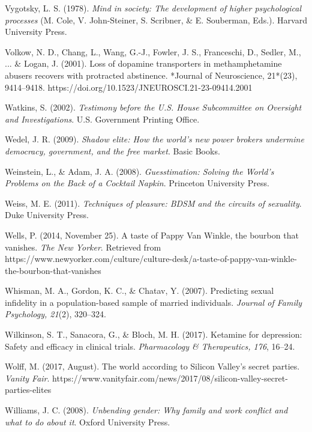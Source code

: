 \begin{thebibliography}{}
    Vygotsky, L. S. (1978). \textit{Mind in society: The development of higher psychological processes} (M. Cole, V. John-Steiner, S. Scribner, \& E. Souberman, Eds.). Harvard University Press.

    Volkow, N. D., Chang, L., Wang, G.-J., Fowler, J. S., Franceschi, D., Sedler, M., ... \& Logan, J. (2001). Loss of dopamine transporters in methamphetamine abusers recovers with protracted abstinence. *Journal of Neuroscience, 21*(23), 9414–9418. https://doi.org/10.1523/JNEUROSCI.21-23-09414.2001

    
    Watkins, S. (2002). \textit{Testimony before the U.S. House Subcommittee on Oversight and Investigations}. U.S. Government Printing Office.

    Wedel, J. R. (2009). \textit{Shadow elite: How the world's new power brokers undermine democracy, government, and the free market}. Basic Books.

    Weinstein, L., \& Adam, J. A. (2008). \textit{Guesstimation: Solving the World's Problems on the Back of a Cocktail Napkin}. Princeton University Press.

    Weiss, M. E. (2011). \textit{Techniques of pleasure: BDSM and the circuits of sexuality}. Duke University Press.

    Wells, P. (2014, November 25). A taste of Pappy Van Winkle, the bourbon that vanishes. \textit{The New Yorker}. Retrieved from https://www.newyorker.com/culture/culture-desk/a-taste-of-pappy-van-winkle-the-bourbon-that-vanishes

    Whisman, M. A., Gordon, K. C., \& Chatav, Y. (2007). Predicting sexual infidelity in a population-based sample of married individuals. \textit{Journal of Family Psychology, 21}(2), 320–324.

    Wilkinson, S. T., Sanacora, G., \& Bloch, M. H. (2017). Ketamine for depression: Safety and efficacy in clinical trials. \textit{Pharmacology \& Therapeutics, 176}, 16–24.

    Wolff, M. (2017, August). The world according to Silicon Valley’s secret parties. \textit{Vanity Fair}. https://www.vanityfair.com/news/2017/08/silicon-valley-secret-parties-elites
    
    Williams, J. C. (2008). \textit{Unbending gender: Why family and work conflict and what to do about it}. Oxford University Press.


\end{thebibliography}
